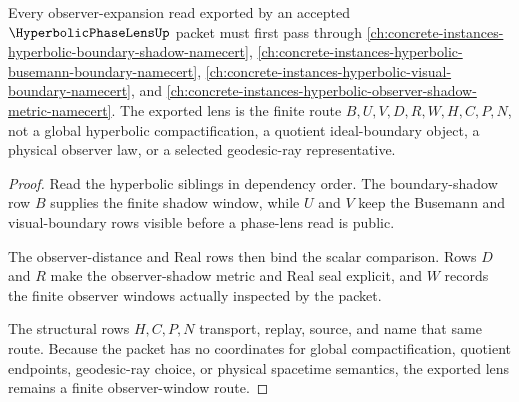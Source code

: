 \begin{theorem}
\label{thm:hyperbolic-phase-lens-observer-window-route}
Every observer-expansion read exported by an accepted $\HyperbolicPhaseLensUp$ packet must first pass through \autoref{ch:concrete-instances-hyperbolic-boundary-shadow-namecert}, \autoref{ch:concrete-instances-hyperbolic-busemann-boundary-namecert}, \autoref{ch:concrete-instances-hyperbolic-visual-boundary-namecert}, and \autoref{ch:concrete-instances-hyperbolic-observer-shadow-metric-namecert}. The exported lens is the finite route $B,U,V,D,R,W,H,C,P,N$, not a global hyperbolic compactification, a quotient ideal-boundary object, a physical observer law, or a selected geodesic-ray representative.
\end{theorem}
\begin{proof}
Read the hyperbolic siblings in dependency order. The boundary-shadow row $B$ supplies the finite shadow window, while $U$ and $V$ keep the Busemann and visual-boundary rows visible before a phase-lens read is public.

The observer-distance and Real rows then bind the scalar comparison. Rows $D$ and $R$ make the observer-shadow metric and Real seal explicit, and $W$ records the finite observer windows actually inspected by the packet.

The structural rows $H,C,P,N$ transport, replay, source, and name that same route. Because the packet has no coordinates for global compactification, quotient endpoints, geodesic-ray choice, or physical spacetime semantics, the exported lens remains a finite observer-window route.
\end{proof}




